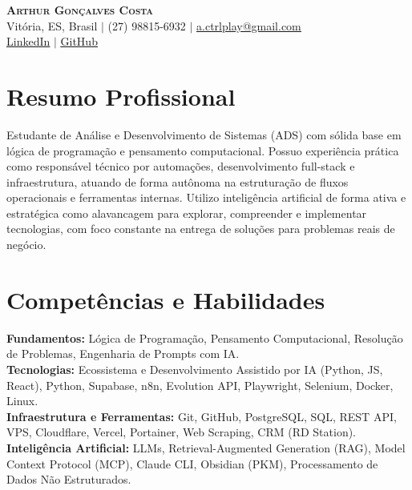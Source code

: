 \documentclass[letterpaper,11pt]{article}
\begin{document}
\begin{center}
    \textbf{\Huge \scshape Arthur Gonçalves Costa} \\ \vspace{5pt}
    \small Vitória, ES, Brasil $|$ (27) 98815-6932 $|$ \href{mailto:a.ctrlplay@gmail.com}{\underline{a.ctrlplay@gmail.com}} \\ \vspace{2pt}
    \href{https://www.linkedin.com/in/arthur-gon\%C3\%A7alves-costa-68153930b/}{\underline{LinkedIn}} $|$ 
    \href{https://github.com/lovssthzn}{\underline{GitHub}}
\end{center}

\section{Resumo Profissional}
\vspace{2pt}
\small{Estudante de Análise e Desenvolvimento de Sistemas (ADS) com sólida base em lógica de programação e pensamento computacional. Possuo experiência prática como responsável técnico por automações, desenvolvimento full-stack e infraestrutura, atuando de forma autônoma na estruturação de fluxos operacionais e ferramentas internas. Utilizo inteligência artificial de forma ativa e estratégica como alavancagem para explorar, compreender e implementar tecnologias, com foco constante na entrega de soluções para problemas reais de negócio.}

\section{Competências e Habilidades}
 \begin{itemize}[leftmargin=0.15in, label={}]
    \small{\item{
     \textbf{Fundamentos:}{ Lógica de Programação, Pensamento Computacional, Resolução de Problemas, Engenharia de Prompts com IA.} \\
     \textbf{Tecnologias:}{ Ecossistema e Desenvolvimento Assistido por IA (Python, JS, React), Python, Supabase, n8n, Evolution API, Playwright, Selenium, Docker, Linux.} \\
     \textbf{Infraestrutura e Ferramentas:}{ Git, GitHub, PostgreSQL, SQL, REST API, VPS, Cloudflare, Vercel, Portainer, Web Scraping, CRM (RD Station).} \\
     \textbf{Inteligência Artificial:}{ LLMs, Retrieval-Augmented Generation (RAG), Model Context Protocol (MCP), Claude CLI, Obsidian (PKM), Processamento de Dados Não Estruturados.}
    }}
 \end{itemize}
\end{document}
